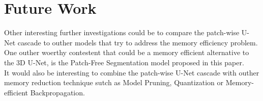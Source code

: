 \section{Future Work}
Other interesting further investigations could be to compare the patch-wise U-Net cascade to outher models that try to address the memory efficiency problem. One outher woerthy contestent that could be a memory efficient alternative to the 3D U-Net,
is the Patch-Free Segmentation model proposed in this paper\cite{wang_super-resolution_2023}.\\[1ex]
It would also be interesting to combine the patch-wise U-Net cascade with outher memory reduction technique sutch as Model Pruning, Quantization or Memory-efficient Backpropagation.